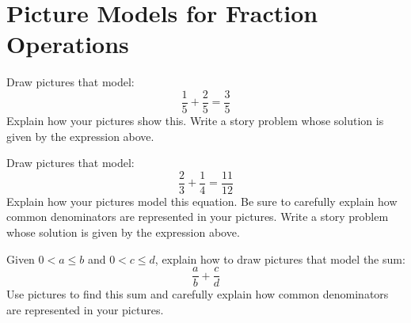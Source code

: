 \newpage
\section{Picture Models for Fraction Operations}\label{A:FO}
\begin{prob} 
Draw pictures that model:
\[
\frac{1}{5} + \frac{2}{5} = \frac{3}{5}
\]
Explain how your pictures show this. Write a story problem whose
solution is given by the expression above.
\end{prob}

\begin{prob} 
Draw pictures that model:
\[
\frac{2}{3} + \frac{1}{4} = \frac{11}{12}
\]
Explain how your pictures model this equation. Be sure to carefully
explain how common denominators are represented in your
pictures. Write a story problem whose solution is given by the
expression above.
\end{prob}

\begin{prob} 
Given $0<a\le b$ and $0<c\le d$, explain how to draw pictures
that model the sum:
\[
\frac{a}{b} + \frac{c}{d}
\]
Use pictures to find this sum and carefully explain how common
denominators are represented in your pictures.
\end{prob}

%
%
%
